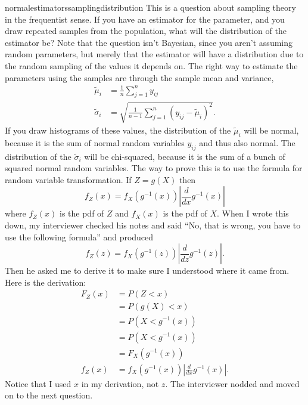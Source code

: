 \begin{answer}{normalestimatorssamplingdistribution}
This is a question about sampling theory in the frequentist sense.
If you have an estimator for the parameter, and you draw repeated samples from the population, what will the distribution of the estimator be?
Note that the question isn't Bayesian, since you aren't assuming random parameters, but merely that the estimator will have a distribution due to the random sampling of the values it depends on.
The right way to estimate the parameters using the samples are through the sample mean and variance,
\begin{align*}
  \tilde{\mu}_i &= \frac{1}{n}\sum_{j=1}^{n}{y_{ij}} \\
  \tilde{\sigma}_i &=
 \sqrt{ \frac{1}{n-1} \sum_{j=1}^{n}{(y_{ij} - \tilde{\mu}_i)^2} }
 \text{.}
\end{align*}
If you draw histograms of these values, the distribution of the
$\tilde{\mu}_i$
will be normal,
because it is the sum of normal random variables $y_{ij}$ and thus also normal.
The distribution of the
$\tilde{\sigma}_i$
will be chi-squared, because it is the sum of a bunch of squared normal random variables.
The way to prove this is to use the formula for random variable transformation.
If $Z = g(X)$
then
\[
  f_Z(x) =  f_X( g^{-1}(x) )\left| \frac{d}{dx} g^{-1}(x) \right|
\]
where
$f_Z(x)$ is the pdf of $Z$ and
$f_X(x)$ is the pdf of $X$.
When I wrote this down, my interviewer
checked his notes and said
``No, that is wrong, you have to use the following formula'' and produced
\[
  f_Z(z) =  f_X( g^{-1}(z) )\left| \frac{d}{dz} g^{-1}(z) \right|
  \text{.}
\]
Then he asked me to derive it to make sure I understood where it came from.
Here is the derivation:
\begin{align*}
  F_Z(x)
  &=  P(Z < x) \\
  &=  P(g(X) < x) \\
  &=  P(X < g^{-1}(x)) \\
  &=  P(X < g^{-1}(x)) \\
  &=  F_X( g^{-1}(x) ) \\
  f_Z(x) &=  f_X( g^{-1}(x) )\left| \frac{d}{dx} g^{-1}(x) \right|
  \text{.}
\end{align*}
Notice that I used $x$ in my derivation, not $z$.
The interviewer nodded and moved on to the next question.
\end{answer}
